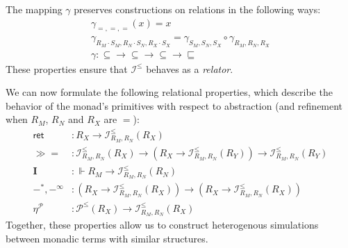 \documentclass[acmsmall,timestamp,review,anonymous]{acmart}
\newcommand{\kw}[1]{\ensuremath{ \mathsf{#1} }}
\newcommand{\bind}{\gg\!\!=}
\begin{document}
The mapping $\gamma$ preserves constructions
on relations in the following ways:
\begin{gather*}
\gamma_{=,=,=}(x) = x \\
\gamma_{R_M \cdot S_M, R_N \cdot S_N, R_X \cdot S_X} =
  \gamma_{S_M, S_N, S_X} \circ \gamma_{R_M, R_N, R_X} \\
\gamma : {\subseteq} \rightarrow {\subseteq} \rightarrow
  {\subseteq} \rightarrow {\sqsubseteq}
\end{gather*}
These properties ensure that
$\mathcal{I}^\le$ behaves as a \emph{relator}.

We can now formulate the following relational properties,
which describe the behavior of the monad's primitives
with respect to abstraction
(and refinement when $R_M$, $R_N$ and $R_X$ are $=$):
\begin{align*}
  \kw{ret} &:
    R_X \rightarrow \mathcal{I}^\le_{R_M,R_N}(R_X) \\
  \bind &:
    \mathcal{I}^\le_{R_M,R_N}(R_X) \rightarrow
    (R_X \rightarrow
     \mathcal{I}^\le_{R_M,R_N}(R_Y)) \rightarrow
    \mathcal{I}^\le_{R_M,R_N}(R_Y) \\
  \mathbf{I} &:
    {}\Vdash R_M \rightarrow
    \mathcal{I}^\le_{R_M,R_N}(R_N) \\
  -^*,
  -^\infty &:
    (R_X \rightarrow \mathcal{I}^\le_{R_M,R_N}(R_X)) \rightarrow
    (R_X \rightarrow \mathcal{I}^\le_{R_M,R_N}(R_X)) \\
  \eta^\mathcal{P} &:
    \mathcal{P}^\le(R_X) \rightarrow
    \mathcal{I}^\le_{R_M,R_N}(R_X)
\end{align*}
Together,
these properties allow us to construct
heterogenous simulations
between monadic terms with similar structures.
\end{document}
